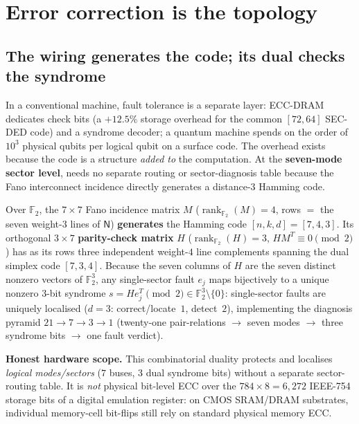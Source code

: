 \section{Error correction is the topology}
\label{sec:ecc}

\subsection{The wiring generates the code; its dual checks the syndrome}

In a conventional machine, fault tolerance is a separate layer: ECC-DRAM
dedicates check bits (a $+12.5\%$ storage overhead for the common
$[72,64]$ SEC-DED code) and a syndrome decoder; a quantum machine spends on
the order of $10^3$ physical qubits per logical qubit on a surface code.
The overhead exists because the code is a structure \emph{added to} the
computation. At the \textbf{seven-mode sector level}, \TALOS{} needs no
separate routing or sector-diagnosis table because the Fano interconnect
incidence directly generates a distance-$3$ Hamming code.

\begin{claimbox}
Over $\mathbb{F}_2$, the $7\times 7$ Fano incidence matrix $M$
($\operatorname{rank}_{\mathbb{F}_2}(M)=4$, rows $=$ the seven weight-$3$ lines
of $\mathsf{N}$) \textbf{generates} the Hamming code $[n,k,d]=[7,4,3]$. Its
orthogonal $3\times 7$ \textbf{parity-check matrix} $H$
($\operatorname{rank}_{\mathbb{F}_2}(H)=3$, $HM^T\equiv 0\pmod 2$) has as its
rows three independent weight-$4$ line complements spanning the dual simplex
code $[7,3,4]$. Because the seven columns of $H$ are the seven distinct nonzero
vectors of $\mathbb{F}_2^3$, any single-sector fault $e_j$ maps bijectively to
a unique nonzero $3$-bit syndrome $s = He_j^T \pmod 2 \in \mathbb{F}_2^3\setminus\{0\}$:
single-sector faults are uniquely localised ($d=3$: correct/locate~$1$,
detect~$2$), implementing the diagnosis pyramid $21\to 7\to 3\to 1$
(twenty-one pair-relations $\to$ seven modes $\to$ three syndrome bits $\to$
one fault verdict).
\end{claimbox}

\noindent\textbf{Honest hardware scope.} This combinatorial duality protects
and localises \emph{logical modes/sectors} ($7$ buses, $3$ dual syndrome bits)
without a separate sector-routing table. It is \emph{not} physical bit-level
ECC over the $784\times 8 = 6{,}272$ IEEE-754 storage bits of a digital
emulation register: on CMOS SRAM/DRAM substrates, individual memory-cell
bit-flips still rely on standard physical memory ECC.

